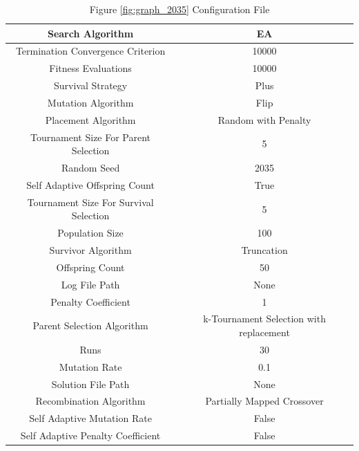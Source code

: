 \documentclass{standalone}
\begin{document}
\begin{table}[!htb]
	\centering
	\caption{Figure \ref{fig:graph_2035} Configuration File}
	\label{tab:graph_2035}
	\begin{tabular}{| c | c |}
		\hline
		Search Algorithm		& EA		 \\
		\hline
		Termination Convergence Criterion		& 10000		 \\
		\hline
		Fitness Evaluations		& 10000		 \\
		\hline
		Survival Strategy		& Plus		 \\
		\hline
		Mutation Algorithm		& Flip		 \\
		\hline
		Placement Algorithm		& Random with Penalty		 \\
		\hline
		Tournament Size For Parent Selection		& 5		 \\
		\hline
		Random Seed		& 2035		 \\
		\hline
		Self Adaptive Offspring Count		& True		 \\
		\hline
		Tournament Size For Survival Selection		& 5		 \\
		\hline
		Population Size		& 100		 \\
		\hline
		Survivor Algorithm		& Truncation		 \\
		\hline
		Offspring Count		& 50		 \\
		\hline
		Log File Path		& None		 \\
		\hline
		Penalty Coefficient		& 1		 \\
		\hline
		Parent Selection Algorithm		& k-Tournament Selection with replacement		 \\
		\hline
		Runs		& 30		 \\
		\hline
		Mutation Rate		& 0.1		 \\
		\hline
		Solution File Path		& None		 \\
		\hline
		Recombination Algorithm		& Partially Mapped Crossover		 \\
		\hline
		Self Adaptive Mutation Rate		& False		 \\
		\hline
		Self Adaptive Penalty Coefficient		& False		 \\
		\hline
	\end{tabular}
\end{table}
\end{document}
